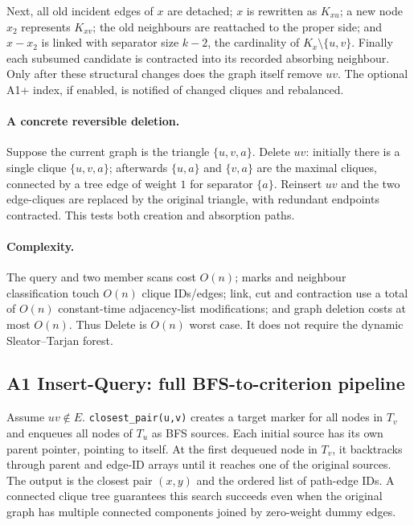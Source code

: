 Next, all old incident edges of \(x\) are detached; \(x\) is rewritten as \(K_{xu}\); a new node \(x_2\) represents \(K_{xv}\); the old neighbours are reattached to the proper side; and \(x-x_2\) is linked with separator size \(k-2\), the cardinality of \(K_x\setminus\{u,v\}\).  Finally each subsumed candidate is contracted into its recorded absorbing neighbour.  Only after these structural changes does the graph itself remove \(uv\).  The optional A1+ index, if enabled, is notified of changed cliques and rebalanced.

\paragraph{A concrete reversible deletion.} Suppose the current graph is the triangle \(\{u,v,a\}\).  Delete \(uv\): initially there is a single clique \(\{u,v,a\}\); afterwards \(\{u,a\}\) and \(\{v,a\}\) are the maximal cliques, connected by a tree edge of weight \(1\) for separator \(\{a\}\).  Reinsert \(uv\) and the two edge-cliques are replaced by the original triangle, with redundant endpoints contracted.  This tests both creation and absorption paths.

\paragraph{Complexity.} The query and two member scans cost \(O(n)\); marks and neighbour classification touch \(O(n)\) clique IDs/edges; link, cut and contraction use a total of \(O(n)\) constant-time adjacency-list modifications; and graph deletion costs at most \(O(n)\).  Thus \textsf{Delete} is \(O(n)\) worst case.  It does not require the dynamic Sleator--Tarjan forest.

\subsection{A1 Insert-Query: full BFS-to-criterion pipeline}
Assume \(uv\notin E\).  \texttt{closest\_pair(u,v)} creates a target marker for all nodes in \(T_v\) and enqueues all nodes of \(T_u\) as BFS sources.  Each initial source has its own parent pointer, pointing to itself.  At the first dequeued node in \(T_v\), it backtracks through parent and edge-ID arrays until it reaches one of the original sources.  The output is the closest pair \((x,y)\) and the ordered list of path-edge IDs.  A connected clique tree guarantees this search succeeds even when the original graph has multiple connected components joined by zero-weight dummy edges.

